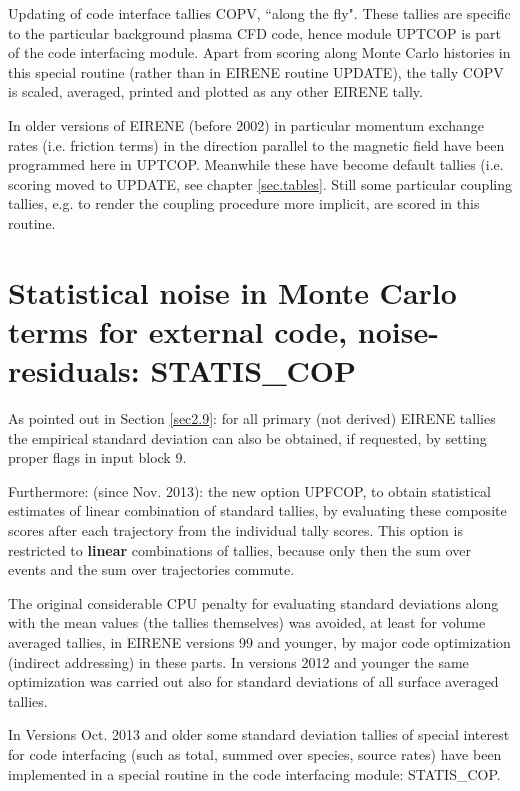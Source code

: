 Updating of code interface tallies COPV, ``along the fly". These tallies
are specific to the particular
background plasma CFD code, hence module UPTCOP is part of the code interfacing module.
Apart from scoring along Monte Carlo histories in this special routine
(rather than in EIRENE routine UPDATE),
the tally COPV is scaled, averaged, printed and plotted as any other EIRENE tally.

In older versions of EIRENE (before 2002) in particular momentum exchange rates (i.e. friction terms) in the
direction parallel to the magnetic field have been programmed here in UPTCOP.
Meanwhile these have become default tallies (i.e. scoring moved to UPDATE,
 see chapter \ref{sec.tables}. Still some particular
coupling tallies, e.g. to render the coupling procedure more implicit,
are scored in this routine.

\medskip

\newpage
\section{Statistical noise in Monte Carlo terms for external code,
noise-residuals: STATIS\_COP
}
\label{sec4.4}

As pointed out in Section \ref{sec2.9}:  for all primary (not derived)
EIRENE tallies the empirical standard deviation can also be obtained,
if requested, by setting proper flags in input block 9.


Furthermore: (since Nov. 2013): the new option UPFCOP, to obtain statistical estimates of linear
combination of standard tallies, by evaluating these composite scores after each trajectory
from the individual tally scores. This option is restricted to \textbf{linear} combinations of tallies, because
only then the sum over events and the sum over trajectories commute.

The original considerable CPU penalty for evaluating standard deviations along with
the mean values (the tallies themselves)
was avoided, at least for volume averaged tallies, in EIRENE
versions 99 and younger, by major code optimization (indirect addressing) in these
parts. In versions 2012 and younger the same optimization was carried out also for
standard deviations of all surface averaged tallies.

In Versions  Oct. 2013 and older some standard deviation tallies of special interest for code interfacing
(such as total, summed over species, source rates) have been implemented in a
special routine in the code interfacing module: STATIS\_COP.

